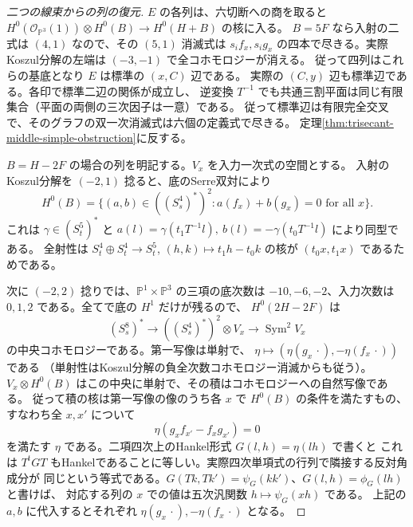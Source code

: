 \begin{proof}[二つの線束からの列の復元]
$E$ の各列は、六切断への商を取ると
$H^0(\mathcal O_{\mathbb P^3}(1))\otimes H^0(B)\to H^0(H+B)$ の核に入る。
$B=5F$ なら入射の二式は $(4,1)$ なので、その $(5,1)$ 消滅式は
$s_i f_x,s_i g_x$ の四本で尽きる。実際Koszul分解の左端は $(-3,-1)$ で全コホモロジーが消える。
従って四列はこれらの基底となり $E$ は標準の $(x,C)$ 辺である。
実際の $(C,y)$ 辺も標準辺である。各印で標準二辺の関係が成立し、
逆変換 $T^{-1}$ でも共通三割平面は同じ有限集合（平面の両側の三次因子は一意）である。
従って標準辺は有限完全交叉で、そのグラフの双一次消滅式は六個の定義式で尽きる。
定理\ref{thm:trisecant-middle-simple-obstruction}に反する。

$B=H-2F$ の場合の列を明記する。$V_x$ を入力一次式の空間とする。
入射のKoszul分解を $(-2,1)$ 捻ると、底のSerre双対により
\[
 H^0(B)=\{(a,b)\in((S_s^4)^*)^2:
                  a(f_x)+b(g_x)=0\text{ for all }x\}.
\]
これは $\gamma\in(S_t^5)^*$ と
$a(l)=\gamma(t_1T^{-1}l),\ b(l)=-\gamma(t_0T^{-1}l)$ により同型である。
全射性は $S_t^4\oplus S_t^4\to S_t^5$, $(h,k)\mapsto t_1h-t_0k$
の核が $(t_0x,t_1x)$ であるためである。

次に $(-2,2)$ 捻りでは、$\mathbb P^1\times\mathbb P^3$ の三項の底次数は
$-10,-6,-2$、入力次数は $0,1,2$ である。全てで底の $H^1$ だけが残るので、
$H^0(2H-2F)$ は
\[
 (S_s^8)^* \longrightarrow ((S_s^4)^*)^2\otimes V_x
     \longrightarrow \operatorname{Sym}^2 V_x
\]
の中央コホモロジーである。第一写像は単射で、
$\eta\mapsto (\eta(g_x\,\cdot),-\eta(f_x\,\cdot))$ である
（単射性はKoszul分解の負全次数コホモロジー消滅からも従う）。
$V_x\otimes H^0(B)$ はこの中央に単射で、その積はコホモロジーへの自然写像である。
従って積の核は第一写像の像のうち各 $x$ で $H^0(B)$ の条件を満たすもの、
すなわち全 $x,x'$ について
\[
                \eta(g_x f_{x'}-f_x g_{x'})=0
\]
を満たす $\eta$ である。二項四次上のHankel形式 $G(l,h)=\eta(lh)$ で書くと
これは $T^t G T$ もHankelであることに等しい。実際四次単項式の行列で隣接する反対角成分が
同じという等式である。$G(Tk,Tk')=\psi_G(kk')$、$G(l,h)=\phi_G(lh)$ と書けば、
対応する列の $x$ での値は五次汎関数 $h\mapsto\psi_G(xh)$ である。
上記の $a,b$ に代入するとそれぞれ $\eta(g_x\,\cdot),-\eta(f_x\,\cdot)$ となる。


\end{proof}
